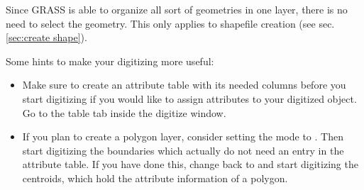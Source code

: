 Since GRASS is able to organize all sort of geometries in one layer, there is no need to select
the geometry. This only applies to shapefile creation (see sec. \ref{sec:create shape}).

Some hints to make your digitizing more useful:
\begin{itemize}
\item Make sure to create an attribute table with its needed columns before you start digitizing
if you would like to assign attributes to your digitized object. 
Go to the table tab inside the digitize window.
\item If you plan to create a polygon layer, consider setting the mode to . 
Then start digitizing the boundaries which actually do not need an entry in the attribute table. 
If you have done this, change back to  and start digitizing the centroids, which 
hold the attribute information of a polygon.

\end{itemize}

